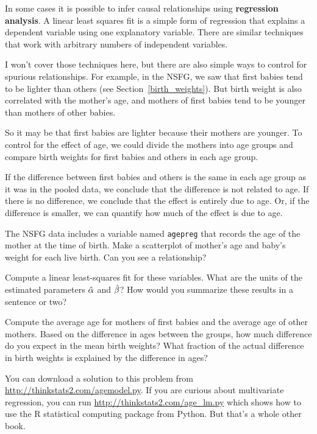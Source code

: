 \documentclass[12pt]{book}
\begin{document}
In some cases it is possible to infer causal relationships using {\bf
  regression analysis}.  A linear least squares fit
is a simple form of regression that explains a dependent
variable using one explanatory variable.  There are similar
techniques that work with arbitrary numbers of independent variables.

I won't cover those techniques here, but there are also simple ways to
control for spurious relationships.  For example, in the NSFG, we saw
that first babies tend to be lighter than others (see
Section~\ref{birth_weights}).  But birth weight is also correlated
with the mother's age, and mothers of first babies tend to be younger
than mothers of other babies.

So it may be that first babies are lighter because their mothers are
younger.  To control for the effect of age, we could divide the mothers
into age groups and compare birth weights for first babies and others
in each age group.

If the difference between first babies and others is the same in
each age group as it was in the pooled data, we conclude
that the difference is not related to age.  If there is no difference,
we conclude that the effect is entirely due to age.  Or,
if the difference is smaller, we can quantify how much of the effect
is due to age.

\begin{exercise}
The NSFG data includes a variable named {\tt agepreg} that records
the age of the mother at the time of birth.
Make a scatterplot of mother's age and baby's weight for each live
birth.  Can you see a relationship?

Compute a linear least-squares fit for these variables.  What are the
units of the estimated parameters $\hat{\alpha}$ and $\hat{\beta}$?
How would you summarize these results in a sentence or two?

Compute the average age for mothers of first babies and the average
age of other mothers.  Based on the difference in ages between the
groups, how much difference do you expect in the mean birth weights?
What fraction of the actual difference in birth weights is explained
by the difference in ages?

You can download a solution to this problem from
\url{http://thinkstats2.com/agemodel.py}.  If you are curious about
multivariate regression, you can run \url{http://thinkstats2.com/age_lm.py}
which shows how to use the R statistical computing package from
Python.  But that's a whole other book.

\end{exercise}
\end{document}
